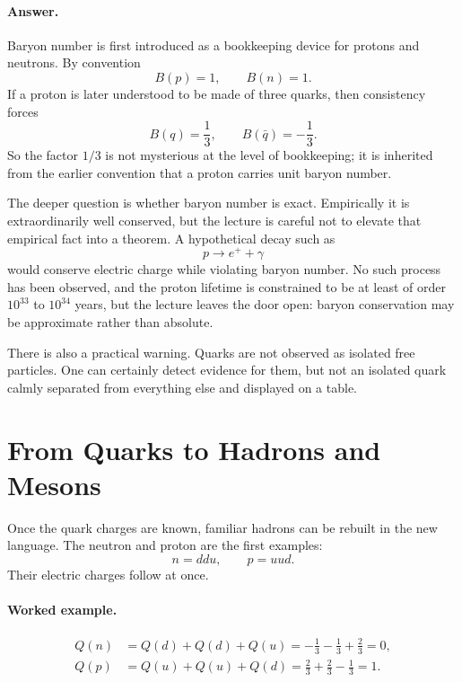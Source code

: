 \paragraph{Answer.} Baryon number is first introduced as a bookkeeping device for protons and neutrons. By convention
\begin{equation}
B(p)=1, \qquad B(n)=1.
\end{equation}
If a proton is later understood to be made of three quarks, then consistency forces
\begin{equation}
B(q)=\frac13,
\qquad
B(\bar q)=-\frac13.
\end{equation}
So the factor \(1/3\) is not mysterious at the level of bookkeeping; it is inherited from the earlier convention that a proton carries unit baryon number.

The deeper question is whether baryon number is exact. Empirically it is extraordinarily well conserved, but the lecture is careful not to elevate that empirical fact into a theorem. A hypothetical decay such as
\begin{equation}
p\to e^+ + \gamma
\end{equation}
would conserve electric charge while violating baryon number. No such process has been observed, and the proton lifetime is constrained to be at least of order \(10^{33}\) to \(10^{34}\) years, but the lecture leaves the door open: baryon conservation may be approximate rather than absolute.

There is also a practical warning. Quarks are not observed as isolated free particles. One can certainly detect evidence for them, but not an isolated quark calmly separated from everything else and displayed on a table.

\section{From Quarks to Hadrons and Mesons}

Once the quark charges are known, familiar hadrons can be rebuilt in the new language. The neutron and proton are the first examples:
\begin{equation}
n=ddu,
\qquad
p=uud.
\end{equation}
Their electric charges follow at once.

\paragraph{Worked example.}
\begin{align}
Q(n) &= Q(d)+Q(d)+Q(u)
= -\frac13-\frac13+\frac23
=0,\\
Q(p) &= Q(u)+Q(u)+Q(d)
= \frac23+\frac23-\frac13
=1.
\end{align}

